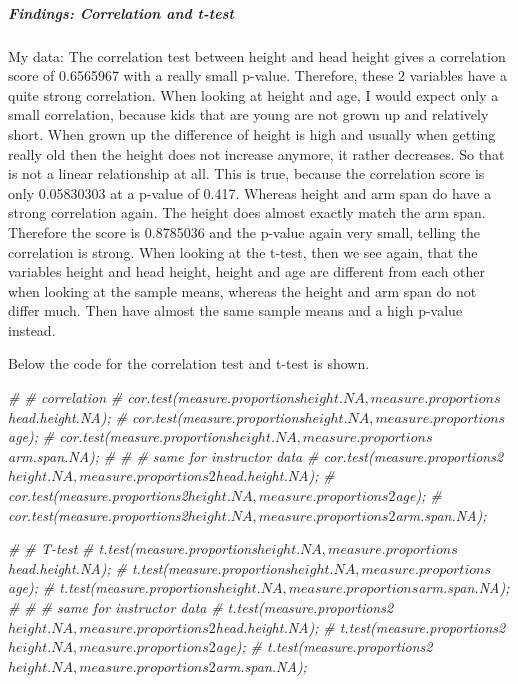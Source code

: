 \documentclass[]{article}
\newenvironment{Shaded}{\begin{snugshade}}{\end{snugshade}}
\newcommand{\CommentTok}[1]{\textcolor[rgb]{0.56,0.35,0.01}{\textit{#1}}}
\begin{document}
\subparagraph{Findings: Correlation and t-test}
\label{sec:appendix-findings-correlation-and-ttest}

My data: The correlation test between height and head height gives a
correlation score of 0.6565967 with a really small p-value. Therefore,
these 2 variables have a quite strong correlation. When looking at
height and age, I would expect only a small correlation, because kids
that are young are not grown up and relatively short. When grown up the
difference of height is high and usually when getting really old then
the height does not increase anymore, it rather decreases. So that is
not a linear relationship at all. This is true, because the correlation
score is only 0.05830303 at a p-value of 0.417. Whereas height and arm
span do have a strong correlation again. The height does almost exactly
match the arm span. Therefore the score is 0.8785036 and the p-value
again very small, telling the correlation is strong. When looking at the
t-test, then we see again, that the variables height and head height,
height and age are different from each other when looking at the sample
means, whereas the height and arm span do not differ much. Then have
almost the same sample means and a high p-value instead.

Below the code for the correlation test and t-test is shown.

\begin{Shaded}
\begin{Highlighting}[]
\CommentTok{\# \# correlation}
\CommentTok{\# cor.test(measure.proportions$height.NA, measure.proportions$head.height.NA);}
\CommentTok{\# cor.test(measure.proportions$height.NA, measure.proportions$age);}
\CommentTok{\# cor.test(measure.proportions$height.NA, measure.proportions$arm.span.NA);}
\CommentTok{\# }
\CommentTok{\# \# same for instructor data}
\CommentTok{\# cor.test(measure.proportions2$height.NA, measure.proportions2$head.height.NA);}
\CommentTok{\# cor.test(measure.proportions2$height.NA, measure.proportions2$age);}
\CommentTok{\# cor.test(measure.proportions2$height.NA, measure.proportions2$arm.span.NA);}


\CommentTok{\# \# T{-}test}
\CommentTok{\# t.test(measure.proportions$height.NA, measure.proportions$head.height.NA);}
\CommentTok{\# t.test(measure.proportions$height.NA, measure.proportions$age);}
\CommentTok{\# t.test(measure.proportions$height.NA, measure.proportions$arm.span.NA);}
\CommentTok{\# }
\CommentTok{\# \# same for instructor data}
\CommentTok{\# t.test(measure.proportions2$height.NA, measure.proportions2$head.height.NA);}
\CommentTok{\# t.test(measure.proportions2$height.NA, measure.proportions2$age);}
\CommentTok{\# t.test(measure.proportions2$height.NA, measure.proportions2$arm.span.NA);}
\end{Highlighting}
\end{Shaded}
\end{document}

